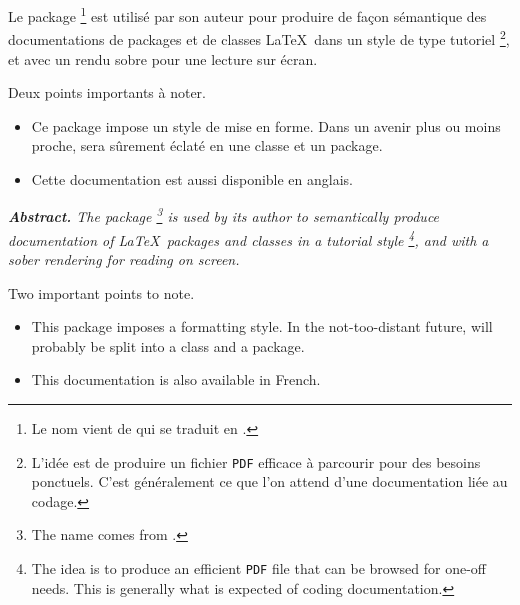 \documentclass[12pt, a4paper]{article}
\begin{document}
\noindent
Le package 
\footnote{
    Le nom vient de  qui se traduit en .
}
est utilisé par son auteur pour produire de façon sémantique des documentations de packages et de classes \LaTeX\ dans un style de type tutoriel
\footnote{
    L'idée est de produire un fichier \texttt{PDF} efficace à parcourir pour des besoins ponctuels. C'est généralement ce que l'on attend d'une documentation liée au codage.
},
et avec un rendu sobre pour une lecture sur écran.

\medskip

\noindent
Deux points importants à noter.
\begin{itemize}
    \item Ce package impose un style de mise en forme. Dans un avenir plus ou moins proche,  sera sûrement éclaté en une classe et un package.

    \item Cette documentation est aussi disponible en anglais.
\end{itemize}




\tdocsep

{\noindent
\small\itshape
\textbf{Abstract.}
The  package
\footnote{
    The name comes from .
}
is used by its author to semantically produce documentation of \LaTeX\ packages and classes in a tutorial style
\footnote{
    The idea is to produce an efficient \texttt{PDF} file that can be browsed for one-off needs. This is generally what is expected of coding documentation.
},
and with a sober rendering for reading on screen.

\medskip

\noindent
Two important points to note.
\begin{itemize}
    \item This package imposes a formatting style. In the not-too-distant future,  will probably be split into a class and a package.

    \item This documentation is also available in French.
\end{itemize}
}
\end{document}
